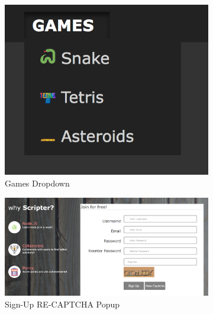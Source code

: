 \documentclass[a4paper]{article}
\begin{document}
\begin{figure}[h!]
  \centering
  \begin{subfigure}[b]{0.3\linewidth}
    \includegraphics[width=\linewidth]{images/games-dropdown.png}
    \caption{Games Dropdown}
    \label{fig:games_dropdown}
  \end{subfigure}
    \begin{subfigure}[b]{0.45\linewidth}
    \includegraphics[width=\linewidth]{images/signup-captcha.png}
    \caption{Sign-Up RE-CAPTCHA Popup}
    \label{fig:signup_popup}
  \end{subfigure}
  \caption{}
\end{figure}
\end{document}
